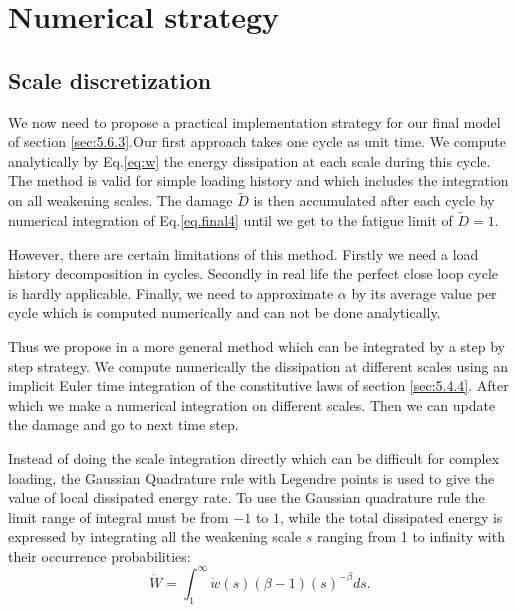 \documentclass[3p,times,procedia,number]{elsarticle}
\begin{document}
\newpage
\section{Numerical strategy}
\label{sec:5.7}
\subsection{Scale discretization}
We now need to propose a practical implementation strategy for our final model of section \ref{sec:5.6.3}.Our first approach takes one cycle as unit time. We compute analytically by Eq.\eqref{eq:w} the energy dissipation at each scale during this cycle. The method is valid for simple loading history and which includes the integration on all weakening scales. The damage $\tilde{D}$ is then accumulated after each cycle by numerical integration of Eq.\eqref{eq.final4} until we get to the fatigue limit of $\tilde{D}=1$.

However, there are certain limitations of this method. Firstly we need a load history decomposition in cycles. Secondly in real life the perfect close loop cycle is hardly applicable. Finally, we need to approximate $\alpha$  by its average value per cycle which is computed numerically and can not be done analytically.

Thus we propose in a more general method which can be integrated by a step by step strategy. We compute numerically the dissipation at different scales using an implicit Euler time integration of the constitutive laws of section \ref{sec:5.4.4}. After which we make a numerical integration on different scales. Then we can update the damage and go to next time step. 

Instead of doing the scale integration directly which can be difficult for complex loading, the Gaussian Quadrature rule with Legendre points is used to give the value of local dissipated energy rate. To use the Gaussian quadrature rule the limit range of integral must be from $-1$ to $1$, while the total dissipated energy  is expressed by integrating all the weakening scale $s$ ranging from 1 to infinity with their occurrence probabilities:
$$\dot{W}=\int_{1}^{\infty}\dot{w}(s) (\beta-1)(s)^{-\beta}ds.$$
\end{document}
